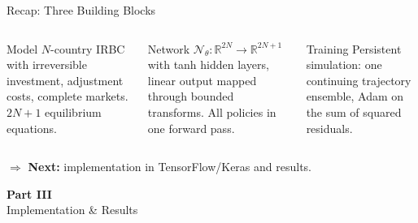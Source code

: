 \documentclass[aspectratio=169,11pt]{beamer}
\newcommand{\R}{\mathbb{R}}
\begin{document}
\begin{frame}{Recap: Three Building Blocks}
\begin{columns}[T]
\begin{block}{Model}
\centering
\small
$N$-country IRBC with irreversible investment, adjustment costs, complete markets. $2N+1$ equilibrium equations.
\end{block}

\begin{block}{Network}
\centering
\small
$\mathcal{N}_\theta: \R^{2N} \to \R^{2N+1}$ with tanh hidden layers, linear output mapped through bounded transforms. All policies in one forward pass.
\end{block}

\begin{block}{Training}
\centering
\small
Persistent simulation: one continuing trajectory ensemble, Adam on the sum of squared residuals.
\end{block}
\end{columns}

\vspace{0.8em}
\begin{center}
$\Rightarrow$ \textbf{Next:} implementation in TensorFlow/Keras and results.
\end{center}
\end{frame}


\begin{frame}{}
\vfill
\begin{center}
{\Huge \textcolor{uzhblue}{\textbf{Part III}}}\\[12pt]
{\LARGE Implementation \& Results}
\end{center}
\vfill
\end{frame}
\end{document}
